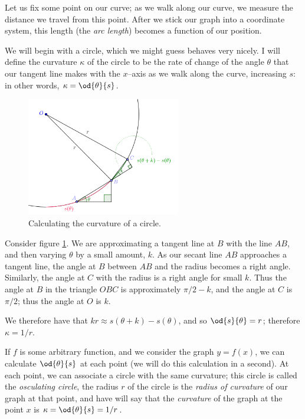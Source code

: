 Let us fix some point on our curve; as we walk along our curve, we measure the distance we travel from this point. After we stick
our graph into a coordinate system, this length (the \emph{arc length}) becomes a function of our position.

We will begin with a circle, which we might guess behaves very nicely. I will define the curvature $ \kappa $ of the circle to be the rate
of change of the angle $ \theta $ that our tangent line makes with the $ x$--axis as we walk along the curve, increasing $ s $:
in other words, $ \kappa = \od{\theta}{s} $.

\begin{figure}
  \centering
  \includegraphics[width=0.6\textwidth]{curvaturecircle}
  \caption{Calculating the curvature of a circle.\label{fig:curvaturecircle}}
\end{figure}

Consider figure \ref{fig:curvaturecircle}. We are approximating a tangent line at $ B $ with the line $ AB $, and then
varying $ \theta $ by a small amount, $ k $. As our secant line $ AB $ approaches a tangent line, the angle at $ B $
between $ AB $ and the radius becomes a right angle. Similarly, the angle at $ C $ with the radius is a right angle for small $ k $. Thus the
angle at $ B $ in the triangle $ OBC $ is approximately $ \pi/2 - k $, and the angle at $ C $ is $ \pi/2 $; thus the angle at $ O $ is $ k $.

We therefore have that $ kr \approx s(\theta + k) - s(\theta) $, and so $ \od{s}{\theta} = r $; therefore $ \kappa = 1/r $.

If $ f $ is some arbitrary function, and we consider the graph $ y = f(x) $, we can calculate $ \od{\theta}{s} $ at each point (we will
do this calculation in a second). At each point, we can associate a circle with the same curvature; this circle is called the \emph{osculating
circle}, the radius $ r $ of the circle is the \emph{radius of curvature} of our graph at that point, and have will say that the \emph{curvature}
of the graph at the point $ x $ is $ \kappa = \od{\theta}{s} = 1/r $.

